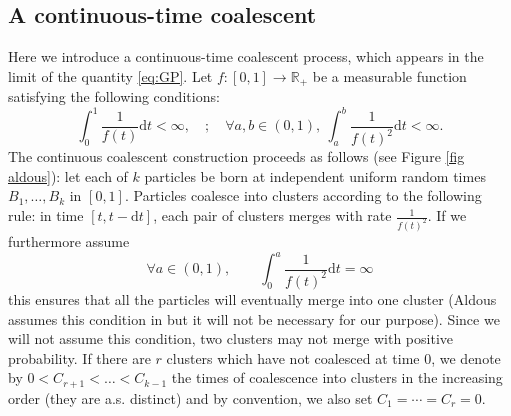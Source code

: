 \documentclass[11pt]{article}
\theoremstyle{plain}
\theoremstyle{definition}
\theoremstyle{remark}
\newcommand{\R}{\mathbb{R}} %
\newcommand{\1}{\mathbbm{1}} %
\begin{document}
\subsection{A continuous-time coalescent}
\label{coalescent continu}


Here we introduce a continuous-time coalescent process, which appears in the limit of the quantity \eqref{eq:GP}.  Let $f:[0,1] \to \R_+$ be a measurable function
satisfying the following conditions:
\[ \int_0^1 \frac{1}{f(t)}\mathrm{d}t < \infty, \quad ; \quad \forall a,b \in (0,1), \ \int_a^b \frac{1}{f(t)^2} \mathrm{d}t <\infty. \]
The continuous coalescent construction proceeds as follows (see Figure \ref{fig aldous}): let each of $k$ particles be born at independent uniform random times $B_1,\ldots,B_k$ in $[0,1]$. Particles coalesce into clusters according to the following rule: in time $[t,t-\mathrm{d}t]$, each pair of clusters merges with rate $\frac{1}{f(t)^2}$. If we furthermore assume
\begin{equation}\label{condition3f}
\forall a \in (0,1), \qquad \int_0^a \frac{1}{f(t)^2} \mathrm{d}t = \infty
\end{equation}
this ensures that all the particles will eventually merge into one cluster (Aldous assumes this condition in \cite{A98} but it will not be necessary for our purpose). Since we will not assume this condition, two clusters may not merge with positive probability. If there are $r$ clusters which have not coalesced at time $0$, we  denote by $0<C_{r+1}< \ldots< C_{k-1}$ the times of coalescence into clusters in the increasing order (they are a.s. distinct) and by convention, we also set $C_1= \cdots = C_r=0$.
\end{document}
